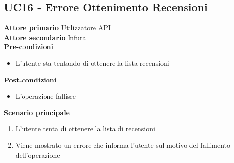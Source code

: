 \subsection{UC16 - Errore Ottenimento Recensioni}
\label{UC16}
\textbf{Attore primario} Utilizzatore API \\
\textbf{Attore secondario} Infura \\
\textbf{Pre-condizioni}
\begin{itemize}
    \item L'utente sta tentando di ottenere la lista recensioni
\end{itemize}
\textbf{Post-condizioni}
\begin{itemize}
    \item L'operazione fallisce
\end{itemize}
\textbf{Scenario principale}
\begin{enumerate}
    \item L'utente tenta di ottenere la lista di recensioni
    \item Viene mostrato un errore che informa l'utente sul motivo del fallimento
          dell'operazione
\end{enumerate}